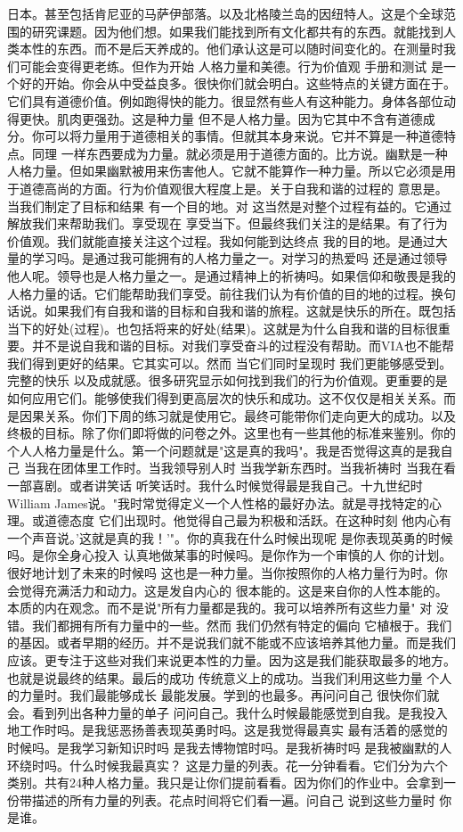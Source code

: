 日本。甚至包括肯尼亚的马萨伊部落。以及北格陵兰岛的因纽特人。这是个全球范围的研究课题。因为他们想。如果我们能找到所有文化都共有的东西。就能找到人类本性的东西。而不是后天养成的。他们承认这是可以随时间变化的。在测量时我们可能会变得更老练。但作为开始 人格力量和美德。行为价值观 手册和测试 是一个好的开始。你会从中受益良多。很快你们就会明白。这些特点的关键方面在于。它们具有道德价值。例如跑得快的能力。很显然有些人有这种能力。身体各部位动得更快。肌肉更强劲。这是种力量 但不是人格力量。因为它其中不含有道德成分。你可以将力量用于道德相关的事情。但就其本身来说。它并不算是一种道德特点。同理 一样东西要成为力量。就必须是用于道德方面的。比方说。幽默是一种人格力量。但如果幽默被用来伤害他人。它就不能算作一种力量。所以它必须是用于道德高尚的方面。行为价值观很大程度上是。关于自我和谐的过程的 意思是。当我们制定了目标和结果 有一个目的地。对 这当然是对整个过程有益的。它通过解放我们来帮助我们。享受现在 享受当下。但最终我们关注的是结果。有了行为价值观。我们就能直接关注这个过程。我如何能到达终点 我的目的地。是通过大量的学习吗。是通过我可能拥有的人格力量之一。对学习的热爱吗 还是通过领导他人呢。领导也是人格力量之一。是通过精神上的祈祷吗。如果信仰和敬畏是我的人格力量的话。它们能帮助我们享受。前往我们认为有价值的目的地的过程。换句话说。如果我们有自我和谐的目标和自我和谐的旅程。这就是快乐的所在。既包括当下的好处(过程)。也包括将来的好处(结果)。这就是为什么自我和谐的目标很重要。并不是说自我和谐的目标。对我们享受奋斗的过程没有帮助。而VIA也不能帮我们得到更好的结果。它其实可以。然而 当它们同时呈现时 我们更能够感受到。完整的快乐 以及成就感。很多研究显示如何找到我们的行为价值观。更重要的是如何应用它们。能够使我们得到更高层次的快乐和成功。这不仅仅是相关关系。而是因果关系。你们下周的练习就是使用它。最终可能带你们走向更大的成功。以及终极的目标。除了你们即将做的问卷之外。这里也有一些其他的标准来鉴别。你的个人人格力量是什么。第一个问题就是"这是真的我吗"。我是否觉得这真的是我自己 当我在团体里工作时。当我领导别人时 当我学新东西时。当我祈祷时 当我在看一部喜剧。或者讲笑话 听笑话时。我什么时候觉得最是我自己。十九世纪时 William James说。"我时常觉得定义一个人性格的最好办法。就是寻找特定的心理。或道德态度 它们出现时。他觉得自己最为积极和活跃。在这种时刻 他内心有一个声音说。'这就是真的我！'"。你的真我在什么时候出现呢 是你表现英勇的时候吗。是你全身心投入 认真地做某事的时候吗。是你作为一个审慎的人 你的计划。很好地计划了未来的时候吗 这也是一种力量。当你按照你的人格力量行为时。你会觉得充满活力和动力。这是发自内心的 很本能的。这是来自你的人性本能的。本质的内在观念。而不是说"所有力量都是我的。我可以培养所有这些力量" 对 没错。我们都拥有所有力量中的一些。然而 我们仍然有特定的偏向 它植根于。我们的基因。或者早期的经历。并不是说我们就不能或不应该培养其他力量。而是我们应该。更专注于这些对我们来说更本性的力量。因为这是我们能获取最多的地方。也就是说最终的结果。最后的成功 传统意义上的成功。当我们利用这些力量 个人的力量时。我们最能够成长 最能发展。学到的也最多。再问问自己 很快你们就会。看到列出各种力量的单子 问问自己。我什么时候最能感觉到自我。是我投入地工作时吗。是我惩恶扬善表现英勇时吗。这是我觉得最真实 最有活着的感觉的时候吗。是我学习新知识时吗 是我去博物馆时吗。是我祈祷时吗 是我被幽默的人环绕时吗。什么时候我最真实？ 这是力量的列表。花一分钟看看。它们分为六个类别。共有24种人格力量。我只是让你们提前看看。因为你们的作业中。会拿到一份带描述的所有力量的列表。花点时间将它们看一遍。问自己 说到这些力量时 你是谁。 

